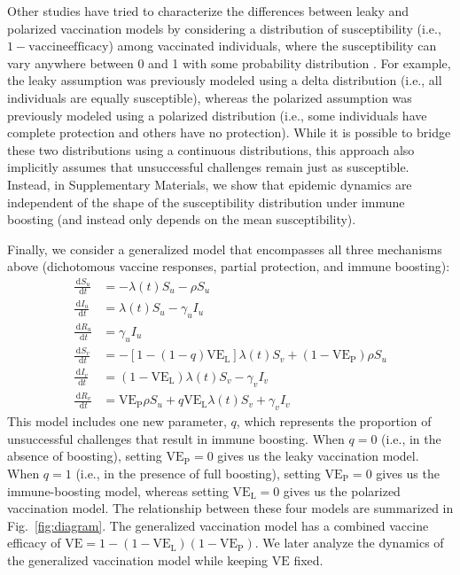 \documentclass[12pt]{article}
\newcommand{\fref}[1]{Fig.~\ref{fig:#1}}
\newcommand{\dd}[1]{\ensuremath{\, \mathrm{d}#1}}
\newcommand{\VE}{\ensuremath{\mathrm{VE}}}
\newcommand{\VEP}{\ensuremath{\VE_{\mathrm{P}}}}
\newcommand{\VEL}{\ensuremath{\VE_{\mathrm{L}}}}
\begin{document}
Other studies have tried to characterize the differences between leaky and polarized vaccination models by considering a distribution of susceptibility (i.e., $1-\mathrm{vaccine efficacy}$) among vaccinated individuals, where the susceptibility can vary anywhere between 0 and 1 with some probability distribution \citep{gomes2014missing}.
For example, the leaky assumption was previously modeled using a delta distribution (i.e., all individuals are equally susceptible), whereas the polarized assumption was previously modeled using a polarized distribution (i.e., some individuals have complete protection and others have no protection). 
While it is possible to bridge these two distributions using a continuous distributions, this approach also implicitly assumes that unsuccessful challenges remain just as susceptible.
Instead, in Supplementary Materials, we show that epidemic dynamics are independent of the shape of the susceptibility distribution under immune boosting (and instead only depends on the mean susceptibility).

Finally, we consider a generalized model that encompasses all three mechanisms above (dichotomous vaccine responses, partial protection, and immune boosting):
\begin{align}
\frac{\dd S_u}{\dd t} &= - \lambda(t) S_u - \rho S_u \\
\frac{\dd I_u}{\dd t} &= \lambda(t) S_u - \gamma_u I_u \\
\frac{\dd R_u}{\dd t} &= \gamma_u I_u \\
\frac{\dd S_v}{\dd t} &= - [1- (1-q) \VEL] \lambda(t) S_v + (1-\VEP) \rho S_u \\
\frac{\dd I_v}{\dd t} &= (1-\VEL) \lambda(t) S_v - \gamma_v I_v \\
\frac{\dd R_v}{\dd t} &= \VEP \rho S_u + q \VEL \lambda(t) S_v + \gamma_v I_v
\end{align}
This model includes one new parameter, $q$, which represents the proportion of unsuccessful challenges that result in immune boosting.
When $q=0$ (i.e., in the absence of boosting), setting $\VEP = 0$ gives us the leaky vaccination model. 
When $q=1$ (i.e., in the presence of full boosting), setting $\VEP = 0$ gives us the immune-boosting model, whereas setting $\VEL = 0$ gives us the polarized vaccination model. 
The relationship between these four models are summarized in \fref{diagram}.
The generalized vaccination model has a combined vaccine efficacy of $\VE = 1- (1-\VEL) (1-\VEP)$.
We later analyze the dynamics of the generalized vaccination model while keeping $\VE$ fixed.
\end{document}
